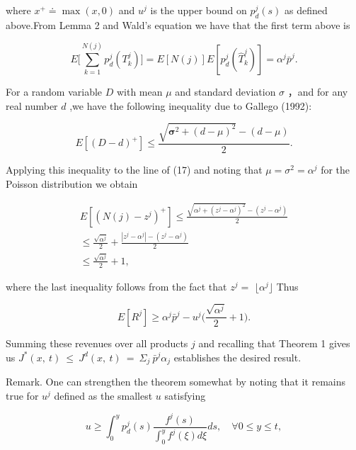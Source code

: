 where \(x ^ { + } \doteq \operatorname* { m a x } ( x , 0 )\) and
\(u ^ { j }\) is the upper bound on \(p _ { d } ^ { j } ( s )\) as
defined above.From Lemma 2 and Wald's equation we have that the first
term above is

\[
E \Big [ \sum _ { k = 1 } ^ { N ( j ) } p _ { d } ^ { j } ( T _ { k } ^ { j } ) \Big ] = E [ N ( j ) ] E [ p _ { d } ^ { j } ( \hat { T } _ { k } ^ { j } ) ] = \alpha ^ { j } \bar { p } ^ { j } .
\]

For a random variable \(D\) with mean \(\mu\) and standard deviation
\(\sigma\) ，and for any real number \(d\) ,we have the following
inequality due to Gallego (1992):

\[
E [ ( D - d ) ^ { + } ] \leqslant \frac { \sqrt { \pmb { \sigma } ^ { 2 } + ( d - \mu ) ^ { 2 } } - ( d - \mu ) } { 2 } .
\]

Applying this inequality to the line of (17) and noting that
\(\mu = \sigma ^ { 2 } = \alpha ^ { j }\) for the Poisson distribution
we obtain

\[
\begin{array} { c } { { E [ ( N ( j ) - z ^ { j } ) ^ { + } ] \leqslant \displaystyle \frac { \sqrt { \alpha ^ { j } + ( z ^ { j } - \alpha ^ { j } ) ^ { 2 } } - ( z ^ { j } - \alpha ^ { j } ) } { 2 } } } \\ { { \displaystyle \leqslant \displaystyle \frac { \sqrt { \alpha ^ { j } } } { 2 } + \frac { | z ^ { j } - \alpha ^ { j } | - ( z ^ { j } - \alpha ^ { j } ) } { 2 } } } \\ { { \displaystyle \leqslant \displaystyle \frac { \sqrt { \alpha ^ { j } } } { 2 } + 1 , } } \end{array}
\]

where the last inequality follows from the fact that \(z ^ { j } =\)
\(\lfloor \alpha ^ { j } \rfloor\) Thus

\[
E [ R ^ { j } ] \geqslant \alpha ^ { j } \bar { p } ^ { j } - u ^ { j } \biggl ( \frac { \sqrt { \alpha ^ { j } } } { 2 } + 1 \biggr ) .
\]

Summing these revenues over all products \(j\) and recalling that
Theorem 1 gives us
\(J ^ { * } ( x , \ t ) \ \leqslant \ J ^ { d } ( x , \ t ) \ = \ \Sigma _ { j } \ \bar { p } ^ { j } \alpha _ { j }\)
establishes the desired result.

Remark. One can strengthen the theorem somewhat by noting that it
remains true for \(u ^ { j }\) defined as the smallest \(u\) satisfying

\[
u \geqslant \int _ { 0 } ^ { y } p _ { d } ^ { j } ( s ) \frac { f ^ { j } ( s ) } { \int _ { 0 } ^ { y } f ^ { j } ( \xi ) d \xi } d s , \quad \forall 0 \leqslant y \leqslant t ,
\]

